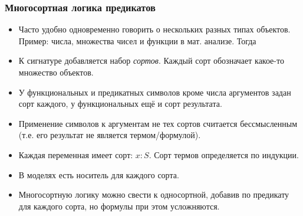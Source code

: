 \documentclass[10pt]{beamer}
\begin{document}
\begin{frame}
    \frametitle{Многосортная логика предикатов}
    \begin{itemize}
        \item Часто удобно одновременно говорить о нескольких разных типах объектов. Пример: числа, множества чисел и функции в мат. анализе. Тогда
        \item К сигнатуре добавляется набор \emph{сортов}. Каждый сорт обозначает какое-то множество объектов.
        \item У функциональных и предикатных символов кроме числа аргументов задан сорт каждого, у функциональных ещё и сорт результата. 
        \item Применение символов к аргументам не тех сортов считается бессмысленным (т.е. его результат не является термом/формулой). 
        \item Каждая переменная имеет сорт: $x:S$. Сорт термов определяется по индукции.
        \item В моделях есть носитель для каждого сорта.
        \item Многосортную логику можно свести к односортной, добавив по предикату для каждого сорта, но формулы при этом усложняются.
    \end{itemize}
\end{frame}
\end{document}
